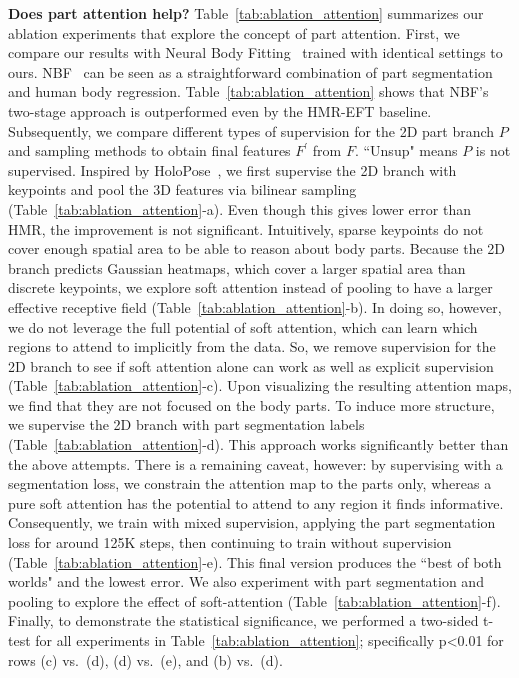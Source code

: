 \documentclass[10pt,twocolumn,letterpaper,usenames,dvipsnames]{article}
\begin{document}
\noindent\textbf{Does part attention help?}
Table~\ref{tab:ablation_attention} summarizes our ablation experiments that explore the concept of part attention. First, we compare our results with Neural Body Fitting~\cite{omran2018nbf} trained with identical settings to ours. NBF~\cite{omran2018nbf} can be seen as a straightforward combination of part segmentation and human body regression. Table~\ref{tab:ablation_attention} shows that NBF's two-stage approach is outperformed even by the HMR-EFT baseline. Subsequently, we compare different types of supervision for the 2D part branch $P$ and sampling methods to obtain final features $F^{\prime}$ from $F$. ``Unsup" means $P$ is not supervised.
Inspired by HoloPose~\cite{guler_2019_CVPR}, we first supervise the 2D branch with keypoints and pool the 3D features via bilinear sampling (Table~\ref{tab:ablation_attention}-a). 
Even though this gives lower error than HMR, the improvement is not significant. 
Intuitively, sparse keypoints do not cover enough spatial area to be able to reason about body parts. 
Because the 2D branch predicts Gaussian heatmaps, which cover a larger spatial area than discrete keypoints, we 
explore soft attention instead of pooling to have a larger effective receptive field (Table~\ref{tab:ablation_attention}-b). 
In doing so, however, we do not leverage the full potential of soft attention, which can learn which regions to attend to implicitly from the data. 
So, we remove supervision for the 2D branch to see if soft attention alone can work as well as explicit supervision (Table~\ref{tab:ablation_attention}-c). 
Upon visualizing the resulting attention maps, we find that they are not focused on the body parts.
To induce more structure, we supervise the 2D branch with part segmentation labels (Table~\ref{tab:ablation_attention}-d). 
This approach works significantly better than the above attempts. 
There is a remaining caveat, however: by supervising with a segmentation loss, we constrain the attention map to the parts only, whereas a pure soft attention has the potential to attend to any region it finds informative. 
Consequently, we train with mixed supervision, applying the part segmentation loss for around 125K steps, then continuing to train without supervision (Table~\ref{tab:ablation_attention}-e). 
This final version produces the ``best of both worlds" and the lowest error. We also experiment with part segmentation and pooling to explore the effect of soft-attention (Table~\ref{tab:ablation_attention}-f). Finally, to demonstrate the statistical significance, we performed a two-sided t-test for all experiments in Table~\ref{tab:ablation_attention}; specifically p\textless0.01 for rows (c) vs.~(d), (d) vs.~(e), and (b) vs.~(d).
\end{document}
